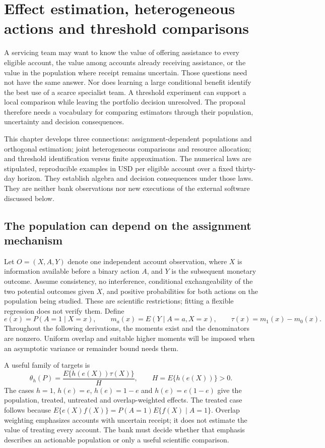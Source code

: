 \chapter{Effect estimation, heterogeneous actions and threshold comparisons}
\label{exec17:s4}

A servicing team may want to know the value of offering assistance to every
eligible account, the value among accounts already receiving assistance, or
the value in the population where receipt remains uncertain. Those questions
need not have the same answer. Nor does learning a large conditional benefit
identify the best use of a scarce specialist team. A threshold experiment can
support a local comparison while leaving the portfolio decision unresolved.
The proposal therefore needs a vocabulary for comparing estimators through
their population, uncertainty and decision consequences.

This chapter develops three connections: assignment-dependent populations and
orthogonal estimation; joint heterogeneous comparisons and resource allocation;
and threshold identification versus finite approximation. The numerical laws
are stipulated, reproducible examples in USD per eligible account over a fixed
thirty-day horizon. They establish algebra and decision consequences under
those laws. They are neither bank observations nor new executions of the
external software discussed below.\citep{exec17_s4_math}

\section{The population can depend on the assignment mechanism}
\label{exec17:s4-target}

Let $O=(X,A,Y)$ denote one independent account observation, where $X$ is
information available before a binary action $A$, and $Y$ is the subsequent
monetary outcome. Assume consistency, no interference, conditional
exchangeability of the two potential outcomes given $X$, and positive
probabilities for both actions on the population being studied. These are
scientific restrictions; fitting a flexible regression does not verify them.
Define
\[
 e(x)=P(A=1\mid X=x),\qquad m_a(x)=E(Y\mid A=a,X=x),\qquad
 \tau(x)=m_1(x)-m_0(x).
\]
Throughout the following derivations, the moments exist and the denominators
are nonzero. Uniform overlap and suitable higher moments will be imposed when
an asymptotic variance or remainder bound needs them.

A useful family of targets is
\begin{equation}
 \theta_h(P)=\frac{E\{h(e(X))\tau(X)\}}{H},\qquad
 H=E\{h(e(X))\}>0.
 \label{exec17:s4-weight-target}
\end{equation}
The cases $h=1$, $h(e)=e$, $h(e)=1-e$ and $h(e)=e(1-e)$ give the population,
treated, untreated and overlap-weighted effects. The treated case follows
because $E\{e(X)f(X)\}=P(A=1)E\{f(X)\mid A=1\}$. Overlap weighting emphasizes
accounts with uncertain receipt; it does not estimate the value of treating
every account. The bank must decide whether that emphasis describes an
actionable population or only a useful scientific comparison.

